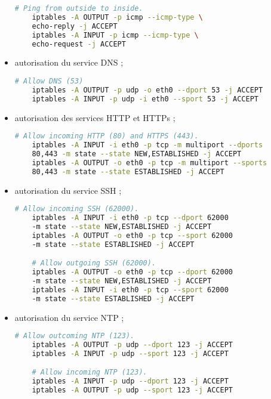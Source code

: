\begin{itemize}
  \begin{lstlisting}[language=bash]
    # Ping from outside to inside.
    iptables -A OUTPUT -p icmp --icmp-type \
    echo-reply -j ACCEPT
    iptables -A INPUT -p icmp --icmp-type \
    echo-request -j ACCEPT
  \end{lstlisting}

\item autorisation du service DNS  ;

  \begin{lstlisting}[language=bash]
    # Allow DNS (53)
    iptables -A OUTPUT -p udp -o eth0 --dport 53 -j ACCEPT
    iptables -A INPUT -p udp -i eth0 --sport 53 -j ACCEPT
  \end{lstlisting}

\item autorisation des services HTTP et HTTPs ;

  \begin{lstlisting}[language=bash]
    # Allow incoming HTTP (80) and HTTPS (443).
    iptables -A INPUT -i eth0 -p tcp -m multiport --dports
    80,443 -m state --state NEW,ESTABLISHED -j ACCEPT
    iptables -A OUTPUT -o eth0 -p tcp -m multiport --sports
    80,443 -m state --state ESTABLISHED -j ACCEPT
  \end{lstlisting}

\item autorisation du service SSH ;

  \begin{lstlisting}[language=bash]
    # Allow incoming SSH (62000).
    iptables -A INPUT -i eth0 -p tcp --dport 62000
    -m state --state NEW,ESTABLISHED -j ACCEPT
    iptables -A OUTPUT -o eth0 -p tcp --sport 62000
    -m state --state ESTABLISHED -j ACCEPT

    # Allow outgoing SSH (62000).
    iptables -A OUTPUT -o eth0 -p tcp --dport 62000
    -m state --state NEW,ESTABLISHED -j ACCEPT
    iptables -A INPUT -i eth0 -p tcp --sport 62000
    -m state --state ESTABLISHED -j ACCEPT
  \end{lstlisting}

  \newpage

\item autorisation du service NTP ;

  \begin{lstlisting}[language=bash]
    # Allow outcoming NTP (123).
    iptables -A OUTPUT -p udp --dport 123 -j ACCEPT
    iptables -A INPUT -p udp --sport 123 -j ACCEPT

    # Allow incoming NTP (123).
    iptables -A INPUT -p udp --dport 123 -j ACCEPT
    iptables -A OUTPUT -p udp --sport 123 -j ACCEPT
  \end{lstlisting}


\end{itemize}
